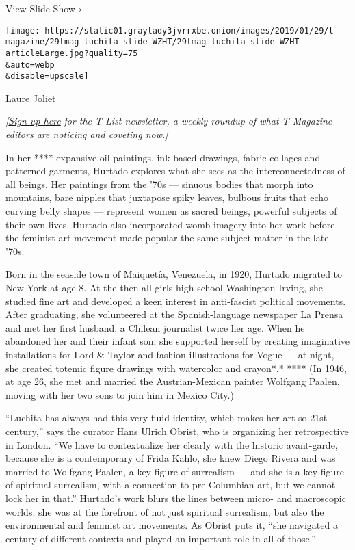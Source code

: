View Slide Show ›

\texttt{[image: https://static01.graylady3jvrrxbe.onion/images/2019/01/29/t-magazine/29tmag-luchita-slide-WZHT/29tmag-luchita-slide-WZHT-articleLarge.jpg?quality=75\\\&auto=webp\\\&disable=upscale]}

Laure Joliet

\emph{{[}}\href{https://www.nytimes3xbfgragh.onion/newsletters/t-list?module=inline}{\emph{Sign
up here}} \emph{for the T List newsletter, a weekly roundup of what T
Magazine editors are noticing and coveting now.{]}}

In her **** expansive oil paintings, ink-based drawings, fabric collages
and patterned garments, Hurtado explores what she sees as the
interconnectedness of all beings. Her paintings from the '70s ---
sinuous bodies that morph into mountains, bare nipples that juxtapose
spiky leaves, bulbous fruits that echo curving belly shapes ---
represent women as sacred beings, powerful subjects of their own lives.
Hurtado also incorporated womb imagery into her work before the feminist
art movement made popular the same subject matter in the late '70s.

Born in the seaside town of Maiquetía, Venezuela, in 1920, Hurtado
migrated to New York at age 8. At the then-all-girls high school
Washington Irving, she studied fine art and developed a keen interest in
anti-fascist political movements. After graduating, she volunteered at
the Spanish-language newspaper La Prensa and met her first husband, a
Chilean journalist twice her age. When he abandoned her and their infant
son, she supported herself by creating imaginative installations for
Lord \& Taylor and fashion illustrations for Vogue --- at night, she
created totemic figure drawings with watercolor and crayon*.* **** (In
1946, at age 26, she met and married the Austrian-Mexican painter
Wolfgang Paalen, moving with her two sons to join him in Mexico City.)

``Luchita has always had this very fluid identity, which makes her art
so 21st century,'' says the curator Hans Ulrich Obrist, who is
organizing her retrospective in London. ``We have to contextualize her
clearly with the historic avant-garde, because she is a contemporary of
Frida Kahlo, she knew Diego Rivera and was married to Wolfgang Paalen, a
key figure of surrealism --- and she is a key figure of spiritual
surrealism, with a connection to pre-Columbian art, but we cannot lock
her in that.'' Hurtado's work blurs the lines between micro- and
macroscopic worlds; she was at the forefront of not just spiritual
surrealism, but also the environmental and feminist art movements. As
Obrist puts it, ``she navigated a century of different contexts and
played an important role in all of those.''

